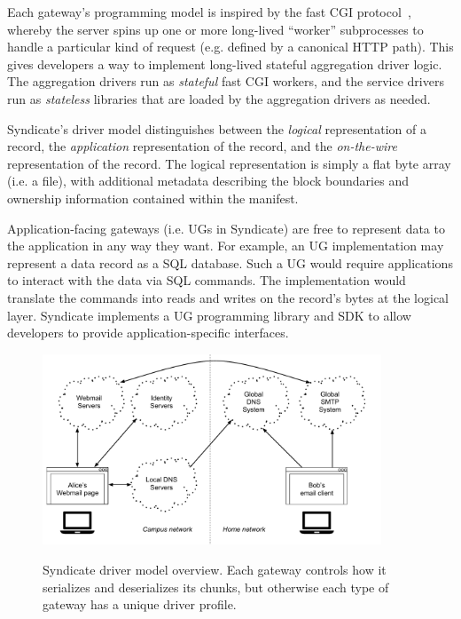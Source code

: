 Each gateway's programming model is inspired by the fast CGI protocol~\cite{fastcgi},
whereby the server spins up one or more long-lived ``worker'' subprocesses to
handle a particular kind of request (e.g. defined by a canonical HTTP path).
This gives developers a way to implement long-lived stateful aggregation driver
logic.  The aggregation drivers run as \emph{stateful} fast CGI workers, and
the service drivers run as \emph{stateless} libraries that are loaded by the
aggregation drivers as needed.

Syndicate's driver model distinguishes between the \emph{logical} representation of a record,
the \emph{application} representation of the record, and the 
\emph{on-the-wire} representation of the record.  The logical representation is
simply a flat byte array (i.e. a file), with
additional metadata describing the block boundaries and ownership information
contained within the manifest.

Application-facing gateways (i.e. UGs in Syndicate) are free to represent data 
to the application in any way they want.  For example, an UG implementation
may represent a data record as a
SQL database.  Such a UG would require applications to interact with the data
via SQL commands.  The implementation would translate the commands into
reads and writes on the record's bytes
at the logical layer.  Syndicate implements a UG programming library and
SDK to allow developers to provide application-specific interfaces.

\begin{figure}[h]
   \caption{Syndicate driver model overview.  Each gateway controls how it
   serializes and deserializes its chunks, but otherwise each type of gateway has a
   unique driver profile.}
   \centering
   \includegraphics[width=0.9\textwidth,page=22]{figures/dissertation-figures}
   \label{fig:chap3-syndicate-driver-model}
\end{figure}

